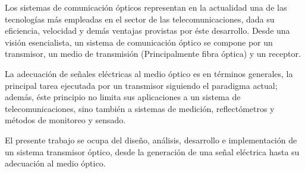 


\begin{abstracts}        %

    Los sistemas de comunicación ópticos representan en la actualidad una de las tecnologías más empleadas en el sector de las telecomunicaciones, dada su eficiencia, velocidad y demás ventajas provistas por éste desarrollo. Desde una visión esencialista, un sistema de comunicación óptico se compone por un transmisor, un medio de transmisión (Principalmente fibra óptica) y un receptor.

    La adecuación de señales eléctricas al medio óptico es en términos generales, la principal tarea ejecutada por un transmisor siguiendo el paradigma actual; además, éste principio no limita sus aplicaciones a un sistema de telecomunicaciones, sino también a sistemas de medición, reflectómetros y métodos de monitoreo y sensado.
    
    El presente trabajo se ocupa del diseño, análisis, desarrollo e implementación de un sistema transmisor óptico, desde la generación de una señal eléctrica hasta su adecuación al medio óptico.   

\end{abstracts}


